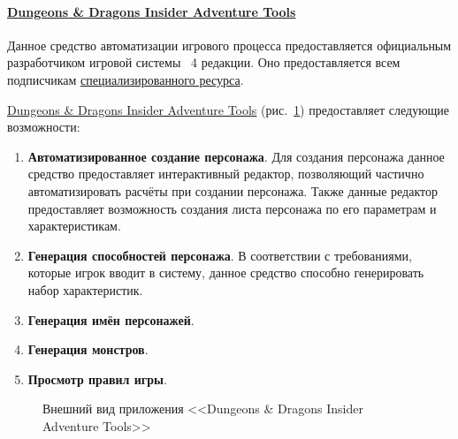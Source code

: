 \paragraph{\href{http://www.wizards.com/dnd/Tool.aspx?x=dnd/4new/tool/adventuretools}{Dungeons \& Dragons Insider Adventure Tools}}
Данное средство автоматизации игрового процесса предоставляется официальным разработчиком игровой системы \dnd\ 4 редакции. Оно предоставляется всем подписчикам \href{http://www.wizards.com/dnd}{специализированного ресурса}.

\href{http://www.wizards.com/dnd/Tool.aspx?x=dnd/4new/tool/adventuretools}{Dungeons \& Dragons Insider Adventure Tools} (рис.~\ref{ris:dnd_insider}) предоставляет следующие возможности:
\begin{enumerate}
\item \textbf{Автоматизированное создание персонажа}. Для создания персонажа данное средство предоставляет интерактивный редактор, позволяющий частично автоматизировать расчёты при создании персонажа. Также данные редактор предоставляет возможность создания листа персонажа по его параметрам и характеристикам.
\item \textbf{Генерация способностей персонажа}. В соответствии с требованиями, которые игрок вводит в систему, данное средство способно генерировать набор характеристик.
\item \textbf{Генерация имён персонажей}.
\item \textbf{Генерация монстров}.
\item \textbf{Просмотр правил игры}.
\end{enumerate}

\begin{figure}[!h]
\caption{Внешний вид приложения <<Dungeons \& Dragons Insider Adventure Tools>>}
\label{ris:dnd_insider}
\end{figure}


